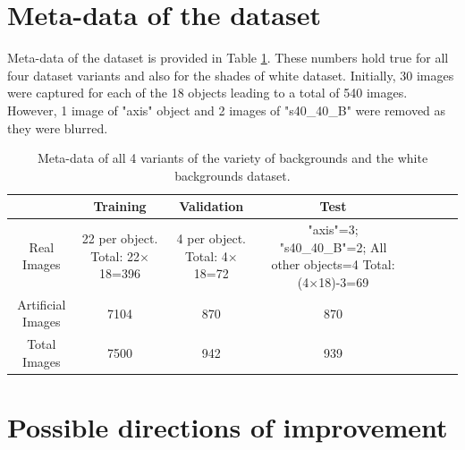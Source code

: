 \section{Meta-data of the dataset}

Meta-data of the dataset is provided in Table \ref{Table:meta}. These numbers hold true for all four dataset variants and also for the shades of white dataset. Initially, 30 images were captured for each of the 18 objects leading to a total of 540 images. However, 1 image of "axis" object and 2 images of "s40\_40\_B" were removed as they were blurred.

\begin{table}
	\centering
	\begin{tabular}{|c|c|c|c|c|c|c|c|}
	\hline 
    & Training & Validation & Test \\ 
	\hline 
	Real Images & \makecell{22 per object.\\ Total: 22$\times$18=396} & \makecell{4 per object.\\ Total: 4$\times$18=72} & 				\makecell{"axis"=3; \\"s40\_40\_B"=2; \\All other objects=4\\ Total: (4$\times$18)-3=69} \\ 
	\hline 
	Artificial Images & 7104 & 870 & 870 \\ 
	\hline 
	Total Images & 7500 & 942 & 939 \\ 
	\hline 
	\end{tabular}
	\caption{Meta-data of all 4 variants of the variety of backgrounds and the white backgrounds dataset.} 
	\label{Table:meta}
\end{table}

\section{Possible directions of improvement}

